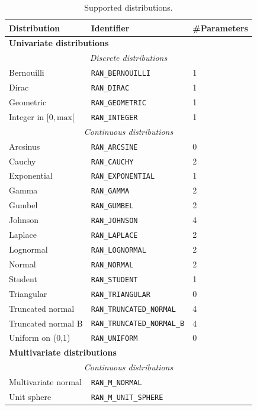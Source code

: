 \begin{table}[htbp]
\begin{center}
\begin{tabular}{|ll|l|}
\hline
{\bf Distribution} & {\bf Identifier} & {\bf \#Parameters} \\
\hline
\multicolumn{3}{|l|}{\bf Univariate distributions} \\
\multicolumn{3}{|c|}{\textit{Discrete distributions}} \\
Bernouilli & \verb|RAN_BERNOUILLI| & 1 \\
Dirac & \verb|RAN_DIRAC| & 1 \\
Geometric & \verb|RAN_GEOMETRIC| & 1 \\
Integer in $[0, \mbox{max}[$ & \verb|RAN_INTEGER| & 1 \\
\multicolumn{3}{|c|}{\textit{Continuous distributions}} \\
Arcsinus & \verb|RAN_ARCSINE| & 0 \\
Cauchy & \verb|RAN_CAUCHY| & 2 \\
Exponential & \verb|RAN_EXPONENTIAL| & 1 \\
Gamma & \verb|RAN_GAMMA| & 2 \\
Gumbel & \verb|RAN_GUMBEL| & 2 \\
Johnson & \verb|RAN_JOHNSON| & 4 \\
Laplace & \verb|RAN_LAPLACE| & 2 \\
Lognormal & \verb|RAN_LOGNORMAL| & 2 \\
Normal & \verb|RAN_NORMAL| & 2 \\
Student & \verb|RAN_STUDENT| & 1 \\
Triangular & \verb|RAN_TRIANGULAR| & 0 \\
Truncated normal & \verb|RAN_TRUNCATED_NORMAL| & 4 \\
Truncated normal B & \verb|RAN_TRUNCATED_NORMAL_B| & 4 \\
Uniform on (0,1) & \verb|RAN_UNIFORM| & 0 \\
\hline
\multicolumn{3}{|l|}{\bf Multivariate distributions} \\
\multicolumn{3}{|c|}{\textit{Continuous distributions}} \\
Multivariate normal & \verb|RAN_M_NORMAL| \\
Unit sphere & \verb|RAN_M_UNIT_SPHERE| \\
\hline
\end{tabular}
\end{center}
\label{tab:distributions}
\caption{Supported distributions.}
\end{table}

